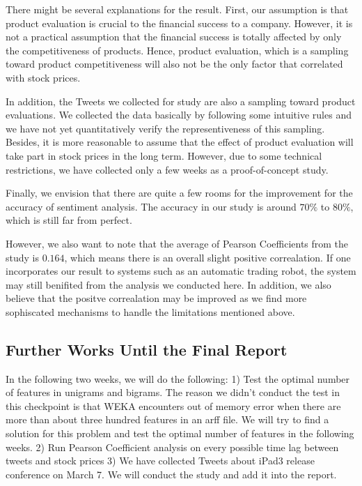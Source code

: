 \documentclass[12pt]{article}
\begin{document}
There might be several explanations for the result. First, our assumption is that product evaluation is crucial to the financial success to a company. However, it is not a practical assumption that the financial success is totally affected by only the competitiveness of products. Hence, product evaluation, which is a sampling toward product competitiveness will also not be the only factor that correlated with stock prices.

In addition, the Tweets we collected for study are also a sampling toward product evaluations. We collected the data basically by following some intuitive rules and we have not yet quantitatively verify the representiveness of this sampling. Besides, it is more reasonable to assume that the effect of product evaluation will take part in stock prices in the long term. However, due to some technical restrictions, we have collected only a few weeks as a proof-of-concept study.

Finally, we envision that there are quite a few rooms for the improvement for the accuracy of sentiment analysis. The accuracy in our study is around $70\%$ to $80\%$, which is still far from perfect.

However, we also want to note that the average of Pearson Coefficients from the study is $0.164$, which means there is an overall slight positive correalation. If one incorporates our result to systems such as an automatic trading robot, the system may still benifited from the analysis we conducted here. In addition, we also believe that the positve correalation may be improved as we find more sophiscated mechanisms to handle the limitations mentioned above.

\subsection{Further Works Until the Final Report}
In the following two weeks, we will do the following: 1) Test the optimal number of features in unigrams and bigrams. The reason we didn't conduct the test in this checkpoint is that WEKA encounters out of memory error when there are more than about three hundred features in an arff file. We will try to find a solution for this problem and test the optimal number of features in the following weeks. 2) Run Pearson Coefficient analysis on every possible time lag between tweets and stock prices 3) We have collected Tweets about iPad3 release conference on March 7. We will conduct the study and add it into the report.
\end{document}
